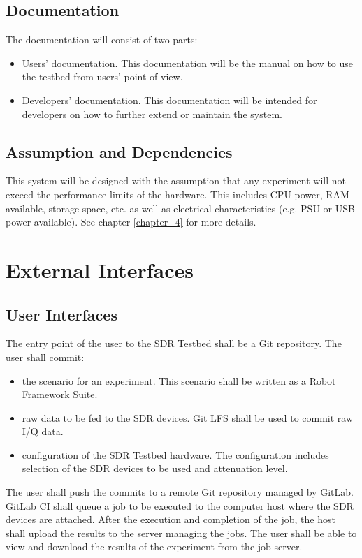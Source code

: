 \documentclass[english,titlepage,a4paper]{report}
\begin{document}
\section{Documentation}

The documentation will consist of two parts:
\begin{itemize}
\item Users' documentation.
  This documentation will be the manual on how to use the testbed from users' point of view.
\item Developers' documentation.
  This documentation will be intended for developers on how to further extend or maintain the system.
\end{itemize}

\section{Assumption and Dependencies}

This system will be designed with the assumption that any experiment will not exceed the performance limits of the hardware.
This includes CPU power, RAM available, storage space, etc. as well as electrical characteristics (e.g. PSU or USB power available).
See chapter \ref{chapter_4} for more details.


\chapter{External Interfaces}
\section{User Interfaces}

The entry point of the user to the SDR Testbed shall be a Git repository.
The user shall commit:
\begin{itemize}
\item the scenario for an experiment.
  This scenario shall be written as a Robot Framework Suite.
\item raw data to be fed to the SDR devices.
  Git LFS shall be used to commit raw I/Q data.
\item configuration of the SDR Testbed hardware.
  The configuration includes selection of the SDR devices to be used and attenuation level.
\end{itemize}
The user shall push the commits to a remote Git repository managed by GitLab.
GitLab CI shall queue a job to be executed to the computer host where the SDR devices are attached.
After the execution and completion of the job, the host shall upload the results to the server managing the jobs.
The user shall be able to view and download the results of the experiment from the job server.
\end{document}
